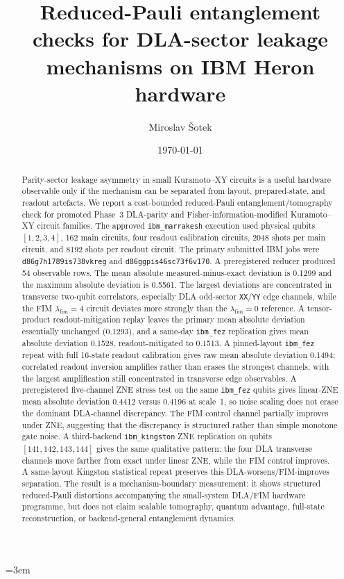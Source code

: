 \documentclass[preprint,aps,physrev,superscriptaddress,floatfix,longbibliography]{revtex4-2}
\begin{document}
\emergencystretch=3em

\title{Reduced-Pauli entanglement checks for DLA-sector leakage mechanisms on IBM Heron hardware}

\author{Miroslav \v{S}otek}

\date{\today}

\begin{abstract}
Parity-sector leakage asymmetry in small Kuramoto--XY circuits is a useful
hardware observable only if the mechanism can be separated from layout,
prepared-state, and readout artefacts. We report a cost-bounded reduced-Pauli
entanglement/tomography check for promoted Phase~3 DLA-parity and
Fisher-information-modified Kuramoto--XY circuit families. The approved
\texttt{ibm\_marrakesh} execution used physical qubits $[1,2,3,4]$, 162 main
circuits, four readout calibration circuits, 2048 shots per main circuit, and
8192 shots per readout circuit. The primary submitted IBM jobs were
\texttt{d86g7h1789is738vkreg} and \texttt{d86ggpis46sc73f6v170}. A
preregistered reducer produced 54 observable rows. The mean absolute
measured-minus-exact deviation is 0.1299 and the maximum absolute deviation is
0.5561. The largest deviations are concentrated in transverse two-qubit
correlators, especially DLA odd-sector \texttt{XX}/\texttt{YY} edge channels,
while the FIM $\lambda_{\mathrm{fim}}=4$ circuit deviates more strongly than
the $\lambda_{\mathrm{fim}}=0$ reference. A tensor-product readout-mitigation
replay leaves the primary mean absolute deviation essentially unchanged
(0.1293), and a same-day \texttt{ibm\_fez} replication gives mean absolute
deviation 0.1528, readout-mitigated to 0.1513. A pinned-layout
\texttt{ibm\_fez} repeat with full 16-state readout calibration gives raw mean
absolute deviation 0.1494; correlated readout inversion amplifies rather than
erases the strongest channels, with the largest amplification still
concentrated in transverse edge observables. A preregistered five-channel ZNE
stress test on the same \texttt{ibm\_fez} qubits gives linear-ZNE mean
absolute deviation 0.4412 versus 0.4196 at scale~1, so noise scaling does not
erase the dominant DLA-channel discrepancy. The FIM control channel partially
improves under ZNE, suggesting that the discrepancy is structured rather than
simple monotone gate noise. A third-backend \texttt{ibm\_kingston} ZNE
replication on qubits $[141,142,143,144]$ gives the same qualitative pattern:
the four DLA transverse channels move farther from exact under linear ZNE,
while the FIM control improves. A same-layout Kingston statistical repeat
preserves this DLA-worsens/FIM-improves separation. The result is a
mechanism-boundary measurement:
it shows structured reduced-Pauli distortions accompanying the small-system
DLA/FIM hardware programme, but does not claim scalable tomography, quantum
advantage, full-state reconstruction, or backend-general entanglement
dynamics.
\end{abstract}
\end{document}
